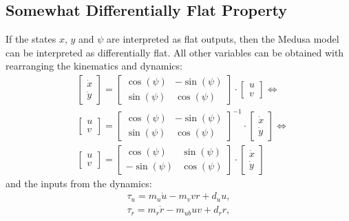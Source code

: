 \subsection{Somewhat Differentially Flat Property}

\par If the states $x$, $y$ and $\psi$ are interpreted as flat outputs, then the Medusa model can be interpreted as differentially flat. All other variables can be obtained with rearranging the kinematics and dynamics:
\begin{equation}
\begin{split}
    & \begin{bmatrix}
        \dot{x} \\ \dot{y}
    \end{bmatrix} = 
    \begin{bmatrix}
        \cos(\psi) & - \sin(\psi) \\
        \sin(\psi) & \cos(\psi)
    \end{bmatrix} \cdot
    \begin{bmatrix}
        u \\ v
    \end{bmatrix} \Leftrightarrow  \\
    & \begin{bmatrix}
        u \\ v
    \end{bmatrix} = 
    \begin{bmatrix}
        \cos(\psi) & - \sin(\psi) \\
        \sin(\psi) & \cos(\psi)
    \end{bmatrix}^{-1} \cdot
    \begin{bmatrix}
        \dot{x} \\ \dot{y}
    \end{bmatrix} \Leftrightarrow \\
    & \begin{bmatrix}
        u \\ v
    \end{bmatrix} = 
    \begin{bmatrix}
        \cos(\psi) & \sin(\psi) \\
        - \sin(\psi) & \cos(\psi)
    \end{bmatrix} \cdot
    \begin{bmatrix}
        \dot{x} \\ \dot{y}
    \end{bmatrix}
\end{split}
\end{equation}
and the  inputs from the dynamics:
\begin{equation} 
    \begin{gathered}
        \tau_u = m_u\dot{u} - m_v v r + d_u u , \\
        \tau_r = m_r \dot{r} - m_{ub} u v + d_r r ,
    \end{gathered}
    \label{eq:rearaged_dynamics}
\end{equation}
 
